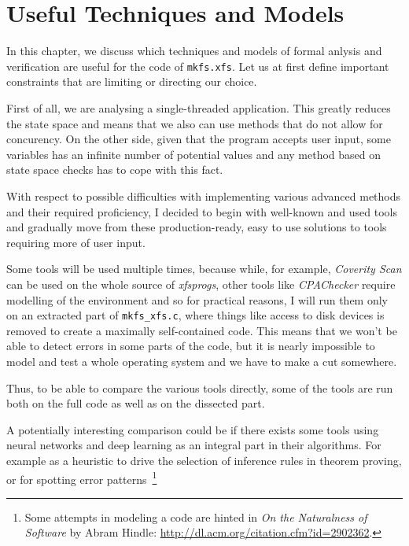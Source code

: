 
\chapter{Useful Techniques and Models}\label{chap:techniques}
In this chapter, we discuss which techniques and models of formal anlysis and verification are useful for the code of {\tt mkfs.xfs}. Let us at first define important constraints that are limiting or directing our choice.

First of all, we are analysing a single-threaded application. This greatly reduces the state space and means that we also can use methods that do not allow for concurency. On the other side, given that the program accepts user input, some variables has an infinite number of potential values and any method based on state space checks has to cope with this fact.

With respect to possible difficulties with implementing various advanced methods and their required proficiency, I decided to begin with well-known and used tools and gradually move from these production-ready, easy to use solutions to tools requiring more of user input.

Some tools will be used multiple times, because while, for example, {\em Coverity Scan} can be used on the whole source of {\em xfsprogs}, other tools like {\em CPAChecker} require modelling of the environment and so for practical reasons, I will run them only on an extracted part of {\tt mkfs\_xfs.c}, where things like access to disk devices is removed to create a maximally self-contained code. This means that we won't be able to detect errors in some parts of the code, but it is nearly impossible to model and test a whole operating system and we have to make a cut somewhere. 

Thus, to be able to compare the various tools directly, some of the tools are run both on the full code as well as on the dissected part.

A potentially interesting comparison could be if there exists some tools using neural networks and deep learning as an integral part in their algorithms. For example as a heuristic to drive the selection of inference rules in theorem proving, or for spotting error patterns~\footnote{Some attempts in modeling a code are hinted in {\em On the Naturalness of Software} by Abram Hindle: \url{http://dl.acm.org/citation.cfm?id=2902362}.}
